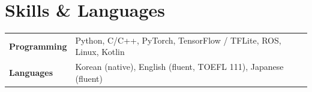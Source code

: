 \documentclass[10pt,a4paper]{article}
\begin{document}
\section{Skills \& Languages}

\begin{tabularx}{\linewidth}{@{}l X@{}}
  \textbf{Programming}\hspace{12pt} & Python, C/C++, PyTorch, TensorFlow / TFLite, ROS, Linux, Kotlin \\[2pt]
  \textbf{Languages} & Korean (native), English (fluent, TOEFL 111), Japanese (fluent) \\
\end{tabularx}
\end{document}
